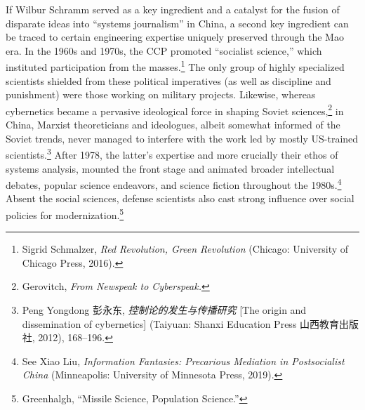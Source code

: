 \documentclass{tufte-handout}
\begin{document}
\begin{CJK*}{UTF8}{gbsn} 

If Wilbur Schramm served as a key ingredient and a catalyst for the
fusion of disparate ideas into ``systems journalism'' in China, a second
key ingredient can be traced to certain engineering expertise uniquely
preserved through the Mao era. In the 1960s and 1970s, the CCP promoted
``socialist science,'' which instituted participation from the
masses.\footnote{Sigrid Schmalzer, \emph{Red Revolution, Green
  Revolution} (Chicago: University of Chicago Press, 2016).} The only
group of highly specialized scientists shielded from these political
imperatives (as well as discipline and punishment) were those working on
military projects. Likewise, whereas cybernetics became a pervasive
ideological force in shaping Soviet sciences,\footnote{Gerovitch,
  \emph{From Newspeak to Cyberspeak.}} in China, Marxist theoreticians
and ideologues, albeit somewhat informed of the Soviet trends, never
managed to interfere with the work led by mostly US-trained
scientists.\footnote{Peng Yongdong 彭永东, \emph{控制论的发生与传播研究}
  {[}The origin and dissemination of cybernetics{]} (Taiyuan: Shanxi
  Education Press 山西教育出版社, 2012), 168--196.} After 1978, the
latter's expertise and more crucially their ethos of systems analysis,
mounted the front stage and animated broader intellectual debates,
popular science endeavors, and science fiction throughout the
1980s.\footnote{See Xiao Liu, \emph{Information Fantasies: Precarious
  Mediation in Postsocialist China} (Minneapolis: University of
  Minnesota Press, 2019).} Absent the social sciences, defense
scientists also cast strong influence over social policies for
modernization.\footnote{Greenhalgh, ``Missile Science, Population
  Science.''}


\end{CJK*}
\end{document}
